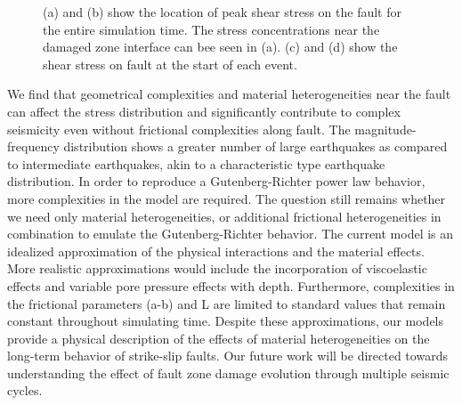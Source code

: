 \documentclass[11pt]{article}
\begin{document}
\begin{figure}[!htb]
{    }
    \caption{(a) and (b) show the location of peak shear stress on the fault for the entire simulation time. The stress concentrations near the damaged zone interface can bee seen in (a). (c) and (d) show the shear stress on fault at the start of each event.}
\end{figure}

We find that geometrical complexities and material heterogeneities near the fault can affect the stress distribution and significantly contribute to complex seismicity even without frictional complexities along fault. The magnitude-frequency distribution shows a greater number of large earthquakes as compared to intermediate earthquakes, akin to a characteristic type earthquake distribution.  In order to reproduce a Gutenberg-Richter power law behavior, more complexities in the model are required. The question still remains whether we need only material heterogeneities, or additional frictional heterogeneities in combination to emulate the Gutenberg-Richter behavior. The current model is an idealized approximation of the physical interactions and the material effects. More realistic approximations would include the incorporation of viscoelastic effects and variable pore pressure effects with depth. Furthermore, complexities in the frictional parameters (a-b) and L are limited to standard values that remain constant throughout simulating time. Despite these approximations, our models provide a physical description of the effects of material heterogeneities on the long-term behavior of strike-slip faults. Our future work will be directed towards understanding the effect of fault zone damage evolution through multiple seismic cycles.

\clearpage
{\footnotesize


}
\end{document}
